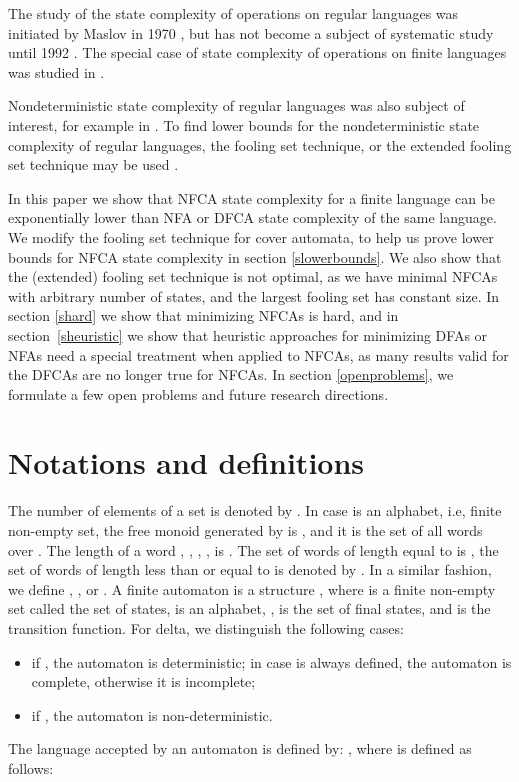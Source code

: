 \documentclass[submission,copyright,creativecommons]{eptcs}
\begin{document}
The study of the state complexity of operations on regular languages was initiated 
by Maslov in 1970 \cite{maslov,maslov1}, but has not become 
a subject of systematic study until 1992 \cite{KaiShengsc92}.
The special case of state complexity of operations 
on finite languages was studied in \cite{finiteop}.

Nondeterministic state complexity of regular languages 
was also subject of interest, for example in 
\cite{holzerKutribNFA,holzerKutribUnary,holzerKutribLata09,holzerKutribNFA09}.
To find lower bounds for the nondeterministic 
state complexity of regular languages, the fooling set technique,
or the extended fooling set technique may 
be used \cite{birget,Shallit,GruberHolzerNFAHard}.

In this paper we show that NFCA state complexity 
for a finite language  can be exponentially lower 
than NFA or DFCA state complexity of the same language.
We modify the fooling set technique for cover automata, 
to help us prove lower bounds for NFCA state complexity
in section \ref{slowerbounds}. We also show that the (extended) fooling set technique 
is not optimal, as we have minimal NFCAs with arbitrary number of states, and the largest fooling set 
has constant size.
In section \ref{shard} we show that minimizing NFCAs is hard, and in section~\ref{sheuristic}
we show that heuristic approaches for minimizing DFAs or NFAs need a special treatment
 when applied to NFCAs, as many results valid for the DFCAs are no longer true for NFCAs.
In section \ref{openproblems}, we formulate a few open problems and future research directions.

\section{Notations and definitions}

The number of elements of a set  is denoted by . 
In case  is an alphabet, i.e, finite non-empty set, the free monoid generated 
by  is , and it is the set of all words over .
The length of a word , , , 
, is .
The set of words of length equal to  is , the set of words of length less than or equal 
to  is denoted by . 
In a similar fashion, we define , , or .
A finite automaton is a structure  , where
 is a finite non-empty set called the set of states,  is an alphabet, ,  
 is the set of final states, and  is the transition function.
For delta, we distinguish the following cases:
\begin{itemize}
 \item if , the automaton is deterministic; 
in case  is always defined, the automaton is complete, otherwise it is incomplete;
 \item if , the automaton is non-deterministic.
\end{itemize}
The language accepted by an automaton is defined by:
, where
 is defined as follows:
\end{document}
